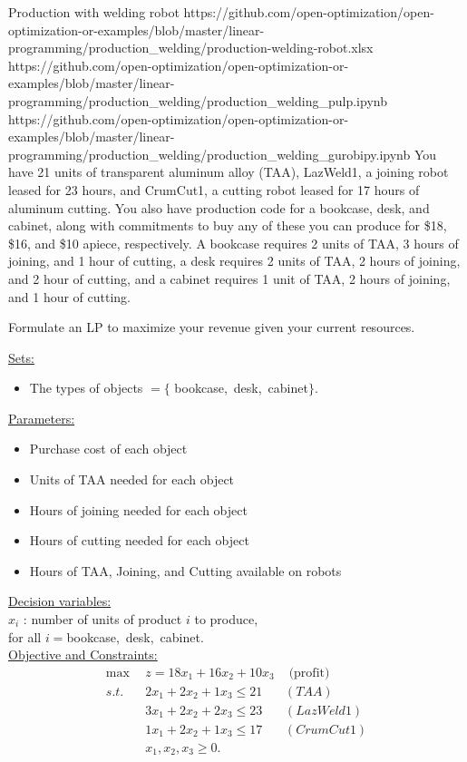 \begin{examplewithallcode}{Production with welding robot}
{https://github.com/open-optimization/open-optimization-or-examples/blob/master/linear-programming/production_welding/production-welding-robot.xlsx}
{https://github.com/open-optimization/open-optimization-or-examples/blob/master/linear-programming/production_welding/production_welding_pulp.ipynb}
{https://github.com/open-optimization/open-optimization-or-examples/blob/master/linear-programming/production_welding/production_welding_gurobipy.ipynb}
You have 21 units of transparent aluminum alloy (TAA), LazWeld1, a joining robot leased for 23 hours, and CrumCut1, a cutting robot leased for 17 hours of aluminum cutting. You also have production code for a bookcase, desk, and cabinet, along with commitments to buy any of these you can produce for \$18,  \$16, and  \$10 apiece, respectively.  A bookcase requires 2 units of TAA, 3 hours of joining, and 1 hour of cutting, a desk requires 2 units of TAA, 2 hours of joining, and 2 hour of cutting, and a cabinet requires 1 unit of TAA, 2 hours of joining, and 1 hour of cutting. 

Formulate an LP to maximize your revenue given your current resources.
\end{examplewithallcode}

\begin{solution}

\noindent\medskip \underline{Sets:}
\begin{itemize}
\item The types of objects $ = \{$ bookcase,~desk,~cabinet$\}$.
\end{itemize}
\medskip \underline{Parameters:} 
\begin{itemize}
\item Purchase cost of each object
\item Units of TAA needed for each object
\item Hours of joining needed for each object
\item Hours of cutting needed for each object
\item Hours of TAA, Joining, and Cutting available on robots
\end{itemize}

\noindent\medskip \underline{Decision variables:} \\
$x_i$ : number of units of product $i$ to produce, \\
for all $ i = $bookcase,~desk,~cabinet.\\

\noindent \medskip \underline{Objective and Constraints:}
\begin{align*}
\max \ \ & z = 18x_1 + 16x_2 + 10x_3  & \text{ (profit)}\\
s.t. \ \ & 2x_1 + 2x_2 + 1x_3 \le 21 & (TAA) \\
& 3x_1 + 2x_2 + 2x_3 \le 23 & (LazWeld1) \\
&  1x_1 + 2x_2 + 1x_3 \le 17 & (CrumCut1)  \\
& x_1, x_2, x_3 \ge 0.
\end{align*}
\end{solution}







